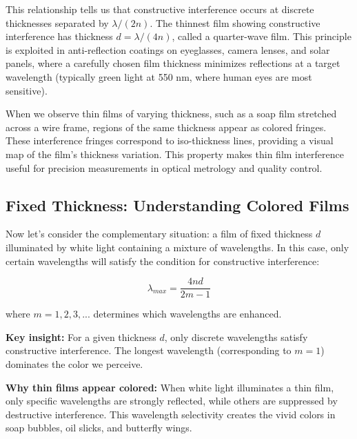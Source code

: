 \documentclass[
  a4paper,
]{book}
\begin{document}
This relationship tells us that constructive interference occurs at
discrete thicknesses separated by \(\lambda/(2n)\). The thinnest film
showing constructive interference has thickness \(d = \lambda/(4n)\),
called a quarter-wave film. This principle is exploited in
anti-reflection coatings on eyeglasses, camera lenses, and solar panels,
where a carefully chosen film thickness minimizes reflections at a
target wavelength (typically green light at 550 nm, where human eyes are
most sensitive).

When we observe thin films of varying thickness, such as a soap film
stretched across a wire frame, regions of the same thickness appear as
colored fringes. These interference fringes correspond to iso-thickness
lines, providing a visual map of the film's thickness variation. This
property makes thin film interference useful for precision measurements
in optical metrology and quality control.

\subsection{Fixed Thickness: Understanding Colored
Films}\label{fixed-thickness-understanding-colored-films}

Now let's consider the complementary situation: a film of fixed
thickness \(d\) illuminated by white light containing a mixture of
wavelengths. In this case, only certain wavelengths will satisfy the
condition for constructive interference:

\begin{tcolorbox}[enhanced jigsaw, breakable, toptitle=1mm, bottomrule=.15mm, colbacktitle=quarto-callout-important-color!10!white, title=\textcolor{quarto-callout-important-color}{\faExclamation}\hspace{0.5em}{Wavelengths Showing Constructive Interference}, arc=.35mm, rightrule=.15mm, bottomtitle=1mm, opacityback=0, toprule=.15mm, coltitle=black, leftrule=.75mm, opacitybacktitle=0.6, colback=white, left=2mm, titlerule=0mm, colframe=quarto-callout-important-color-frame]

\[\lambda_{max}=\frac{4nd}{2m-1}\]

where \(m = 1, 2, 3, ...\) determines which wavelengths are enhanced.

\textbf{Key insight:} For a given thickness \(d\), only discrete
wavelengths satisfy constructive interference. The longest wavelength
(corresponding to \(m = 1\)) dominates the color we perceive.

\textbf{Why thin films appear colored:} When white light illuminates a
thin film, only specific wavelengths are strongly reflected, while
others are suppressed by destructive interference. This wavelength
selectivity creates the vivid colors in soap bubbles, oil slicks, and
butterfly wings.

\end{tcolorbox}
\end{document}
